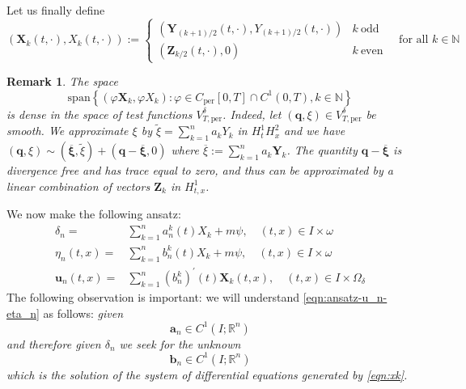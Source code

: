 \documentclass[10pt,a4paper]{article}
\newtheorem{remark}[theorem]{Remark}
\numberwithin{equation}{section}
\begin{document}
Let us finally define \begin{equation}\label{eqn:defn-Xk} 
\left(\mathbf{X}_{k}\left(t,\cdot\right),X_{k}\left(t,\cdot\right)\right):=\begin{cases}
\left(\mathbf{Y}_{(k+1)/2}\left(t,\cdot\right),Y_{(k+1)/2}\left(t,\cdot\right)\right) & k\ \text{odd}\\
\left(\mathbf{Z}_{k/2}\left(t,\cdot\right),0\right) & k\ \text{even}
\end{cases}\quad\text{for all }k\in\mathbb{N}
\end{equation}
\begin{remark}\label{remark:density-in-testfunctions}
The space 
\[
\text{span}\left\{ \left(\varphi\mathbf{X}_{k},\varphi X_{k}\right):\varphi\in C_{\text{per}}\left[0,T\right]\cap C^{1}\left(0,T\right),k\in\mathbb{N}\right\} 
\]
 is dense in the space of test functions $V_{T, \text{per}} ^{\delta}$. 
 Indeed, let  $\left(\mathbf{q},\xi\right)\in V_{T,\text{per}}^{\delta}$ be smooth.
 We approximate $\xi$ by $\tilde \xi=\sum_{k=1}^{n}a_{k}Y_{k}$ in $H^{1}_{t}H^{2}_{x}$ and
 we have $\left(\mathbf{q},\xi\right)\sim\left(\overline{\mathbf{\xi}},\tilde{\xi}\right)+\left(\mathbf{q-}\overline{\mathbf{\xi}},0\right)$ where $\overline{\xi}:=\sum_{k=1}^{n}a_{k}\mathbf{Y}_{k}$. The quantity $\mathbf{q-}\overline{\mathbf{\xi}}$ is divergence free and has trace equal to zero, and thus can be approximated by a linear combination of vectors $\mathbf{Z}_{k}$ in $H^{1}_{t,x}$.
 \end{remark} 
We now make the following ansatz:
\begin{equation}\label{eqn:ansatz-u_n-eta_n}
\begin{aligned}\delta_{n}= & \sum_{k=1}^{n}a_{n}^{k}\left(t\right)X_{k}+m\psi,\quad\left(t,x\right)\in I\times\omega\\
\eta_{n}\left(t,x\right)= & \sum_{k=1}^{n}b_{n}^{k}\left(t\right)X_{k}+m\psi,\quad\left(t,x\right)\in I\times\omega\\
\mathbf{u}_{n}\left(t,x\right)= & \sum_{k=1}^{n}\left(b_{n}^{k}\right)^{\prime}\left(t\right)\mathbf{X}_{k}\left(t,x\right),\quad\left(t,x\right)\in I\times\Omega_{\delta}
\end{aligned}
\end{equation}
The following observation is important:  we will understand \eqref{eqn:ansatz-u_n-eta_n} as follows: 
\emph{given 
\[\mathbf{a}_{n}\in C^{1}\left(I;\mathbb{R}^{n}\right)\]
 and therefore given $\delta_n$ we seek for the unknown   
 \[\mathbf{b}_{n}\in C^{1}\left(I;\mathbb{R}^{n}\right)\]
  which is the solution of the  system of differential equations generated by \eqref{eqn:xk}.
  }
\end{document}
